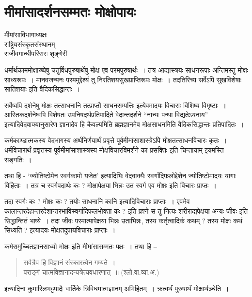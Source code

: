 {\fontsize{15}{17}\selectfont
\presetvalues
\chapter{मीमांसादर्शनसम्मतः मोक्षोपायः}

\begin{center}
\smallskip

मीमांसाविभागाध्यक्षः\\
राष्ट्रियसंस्कृतसंस्थानम् \\
राजीवगान्धीपरिसरः शृङ्गेरी
\addrule
\end{center}
धर्मार्थकाममोक्षाख्येषु चतुर्विधपुरुषार्थेषु मोक्ष एव परमपुरुषार्थः~। तत्र आद्यास्त्रयः साधनरूपाः अन्तिमस्तु मोक्षः साध्यरूपः~। मानवजन्मनः परममुद्देश्यं तु निरतिशयसुखप्राप्तिरूपः मोक्षः~। तदतिरिच्य सर्वेऽपि सुखविशेषाः सातिशयाः इति वैदिकसिद्धान्तः~। 

सर्वेष्वपि दर्शनेषु मोक्षः तत्साधनानि तत्प्राप्तौ साधनसम्पत्तिः इत्येवमादयः विचाराः विशिष्य विमृष्टाः~। आस्तिकदर्शनेष्वपि विशेषतः उपनिषदर्थप्रतिपादिते वेदान्तदर्शने “नान्यः पन्था विद्यतेऽयनाय” इत्यादिवेदवाक्यानुसारेण ज्ञानादेव हि कैवल्यमिति ब्रह्मज्ञानमेव मोक्षसाधनमिति वैदिकसिद्धान्तः प्रतिपादितः~। 

कर्मकाण्डात्मकस्य वेदभागस्य अर्थनिर्णयार्थं प्रवृत्ते पूर्वमीमांसाशास्त्रेऽपि मोक्षतत्साधन\-विचारः कृतः~। धर्मविचारार्थं प्रवृत्तस्य पूर्वमीमांसाशास्त्रस्य मोक्षविचारविमर्शने का प्रसक्तिः इति चिन्तायाम् इयमस्ति सङ्गतिः~। 

तथा हि - ‘ज्योतिष्टोमेन स्वर्गकामो यजेत’ इत्यादिभिः वेदवाक्यैः स्वर्गादिफलोद्देशेन ज्योतिष्टोमादयः यागाः विहिताः~। तत्र च स्वर्गपदार्थः कः ? मोक्षापेक्षया भिन्नः उत स्वर्ग एव मोक्षः इति विचारः प्राप्तः~। 

तदा स्वर्गः कः ? मोक्षः कः ? तयोः साधनानि कानि इत्यादिविचाराः प्राप्ताः~। एवमेव कालान्तरदेहान्तरदेशान्तरभाविस्वर्गादिफलभोक्ता कः ? इति प्रश्ने स तु नित्यः शरीराद्यपेक्षया अन्यः जीवः इति सिद्धान्तितं भाष्ये~। तदा जीवः परमात्मापेक्षया भिन्नः उताभिन्नः, तस्य कर्तृत्वादिकं कथम् ? तस्य मोक्षः कथं सिध्यति ? इत्यादयः मोक्षतदुपायविचाराः प्राप्ताः~। 

कर्मसमुच्चितज्ञानसाध्यो मोक्षः इति मीमांसासम्मतः पक्षः~। तथा हि –
\begin{verse}
सर्वत्रैव हि विज्ञानं संस्कारत्वेन गम्यते~। \\
पराङ्गं चात्मविज्ञानादन्यत्रेत्यवधारणात्~॥ (श्लो.वा.व्या.अ.)
\end{verse}
इत्यादिना कुमारिलभट्टपादैः वार्तिके त्रिविधमात्मज्ञानम् अभिहितम्~। क्रत्वर्थं पुरुषार्थं मोक्षार्थञ्चेति~। 

}
